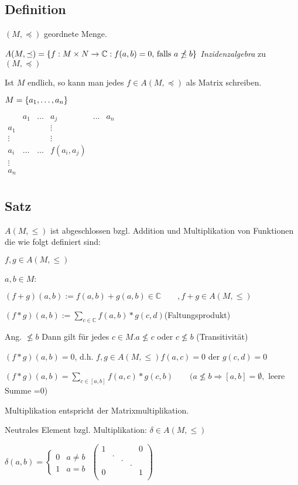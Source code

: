 	\subsection{Definition} %
	
	$(M, \preceq)$ geordnete Menge.
	
	$A(M, \preceq) = \left\{f : M \times N \to \operatorname{\mathbb{C}} : f(a, b) = 0 \text{, falls } a \npreceq b\right\}$ 
	\emph{Inzidenzalgebra} zu $(M, \preceq)$
	
	Ist $M$ endlich, so kann man jedes $f \in A(M, \preceq)$ als Matrix schreiben.
	
	$M = \left\{a_1, \dots, a_n\right\}$
	
	$\begin{array}{c|ccccc}
			& a_1	& \dots & a_j 	& \dots & a_n \\\hline
	a_1  	&		&		&\vdots	\\
	\vdots  &		&		&\vdots \\
	a_i		&\dots 	& \dots & f(a_i, a_j) \\
	\vdots  & \\
	a_n		& \\
	\end{array}$

\subsection{Satz}
$A(M,\leq)$ ist abgeschlossen bzgl. Addition und Multiplikation von Funktionen die wie folgt definiert sind:

$ f,g\in A(M,\leq)$

$a,b \in M$:

$(f+g)(a,b):= f(a,b)+g(a,b) \in \mathbb{C} \qquad ,f+g \in A(M,\leq)$

$(f*g)(a,b):= \sum_{c\in \mathbb{C}}f(a,b)*g(c,d) $\qquad (Faltungsprodukt)

Ang. $ \nleq b$ Dann gilt für jedes $c \in M. a \nleq c$ oder $c\nleq b$ (Transitivität)

$(f*g)(a,b)=0$, d.h. $f,g\in A(M,\leq)f(a,c)=0 $ der $g(c,d)=0$

$(f*g)(a,b) = \sum_{c\in [a,b]}f(a,c)*g(c,b) \qquad(a \nleq b \Rightarrow [a,b] = \emptyset,$ leere Summe =0)

Multiplikation entspricht der Matrixmultiplikation.

Neutrales Element bzgl. Multiplikation: $\delta \in A(M,\leq)$

$\delta(a,b)=\begin{cases}
0 & a\neq b\\
1 & a=b
\end{cases}$ \qquad $\begin{pmatrix}
1 & & & & 0\\
&. & & & \\
& &. & & \\
& & &. & \\
0 & & & &1 \\
\end{pmatrix}
$


